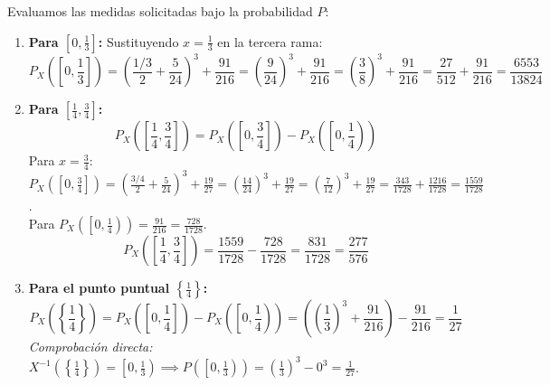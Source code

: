 \begin{problema}
Evaluamos las medidas solicitadas bajo la probabilidad $P$:
\begin{enumerate}[label=\arabic*.]
    \item \textbf{Para $\left[0, \frac{1}{3}\right]$:}
    Sustituyendo $x = \frac{1}{3}$ en la tercera rama:
    \[
        P_X\left(\left[0, \frac{1}{3}\right]\right) = \left(\frac{1/3}{2} + \frac{5}{24}\right)^3 + \frac{91}{216} = \left(\frac{9}{24}\right)^3 + \frac{91}{216} = \left(\frac{3}{8}\right)^3 + \frac{91}{216} = \frac{27}{512} + \frac{91}{216} = \frac{6553}{13824}
    \]

    \item \textbf{Para $\left[\frac{1}{4}, \frac{3}{4}\right]$:}
    \[
        P_X\left(\left[\frac{1}{4}, \frac{3}{4}\right]\right) = P_X\left(\left[0, \frac{3}{4}\right]\right) - P_X\left(\left[0, \frac{1}{4}\right)\right)
    \]
    Para $x = \frac{3}{4}$: $P_X\left(\left[0, \frac{3}{4}\right]\right) = \left(\frac{3/4}{2} + \frac{5}{24}\right)^3 + \frac{19}{27} = \left(\frac{14}{24}\right)^3 + \frac{19}{27} = \left(\frac{7}{12}\right)^3 + \frac{19}{27} = \frac{343}{1728} + \frac{1216}{1728} = \frac{1559}{1728}$.\\
    Para $P_X\left(\left[0, \frac{1}{4}\right)\right) = \frac{91}{216} = \frac{728}{1728}$.
    \[
        P_X\left(\left[\frac{1}{4}, \frac{3}{4}\right]\right) = \frac{1559}{1728} - \frac{728}{1728} = \frac{831}{1728} = \frac{277}{576}
    \]

    \item \textbf{Para el punto puntual $\left\{\frac{1}{4}\right\}$:}
    \[
        P_X\left(\left\{\frac{1}{4}\right\}\right) = P_X\left(\left[0, \frac{1}{4}\right]\right) - P_X\left(\left[0, \frac{1}{4}\right)\right) = \left( \left(\frac{1}{3}\right)^3 + \frac{91}{216} \right) - \frac{91}{216} = \frac{1}{27}
    \]
    \textit{Comprobación directa:} $X^{-1}\left(\left\{\frac{1}{4}\right\}\right) = \left[0, \frac{1}{3}\right) \implies P\left(\left[0, \frac{1}{3}\right)\right) = \left(\frac{1}{3}\right)^3 - 0^3 = \frac{1}{27}$.
\end{enumerate}

\end{problema}